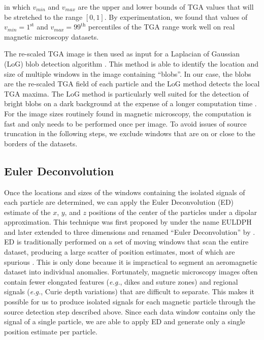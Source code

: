 \noindent
in which $v_{min}$ and $v_{max}$ are the upper and lower bounds of TGA values
that will be stretched to the range $[0, 1]$. By experimentation, we found
that values of $v_{min} = 1^\text{st}$ and $v_{max} = 99^\text{th}$
percentiles of the TGA range work well on real magnetic microscopy datasets.

The re-scaled TGA image is then used as input for a Laplacian of Gaussian (LoG)
blob detection algorithm \citep{Kong2013}. This method is able to identify the
location and size of multiple windows in the image containing ``blobs''. In our
case, the blobs are the re-scaled TGA field of each particle and the LoG method
detects the local TGA maxima. The LoG method is particularly well suited for
the detection of bright blobs on a dark background at the expense of a longer
computation time \citep{Han2016}. For the image sizes routinely found in
magnetic microscopy, the computation is fast and only needs to be performed
once per image. To avoid issues of source truncation in the following steps, we
exclude windows that are on or close to the borders of the datasets.

\subsection{Euler Deconvolution}

Once the locations and sizes of the windows containing the isolated signals of
each particle are determined, we can apply the Euler Deconvolution (ED)
estimate of the $x$, $y$, and $z$ positions of the center of the particles
under a dipolar approximation. This technique was first proposed by
\citet{Thompson1982} under the name EULDPH and later extended to three
dimensions and renamed ``Euler Deconvolution'' by \citet{Reid1990}. ED is
traditionally performed on a set of moving windows that scan the entire
dataset, producing a large scatter of position estimates, most of which are
spurious \citep{Silva20033D}. This is only done because it is impractical to
segment an aeromagnetic dataset into individual anomalies. Fortunately,
magnetic microscopy images often contain fewer elongated features (\textit{e.g.}, dikes and
suture zones) and regional signals (\textit{e.g.}, Curie depth variations) that are
difficult to separate. This makes it possible for us to produce isolated
signals for each magnetic particle through the source detection step described
above. Since each data window contains only the signal of a single particle, we
are able to apply ED and generate only a single position estimate per particle.

